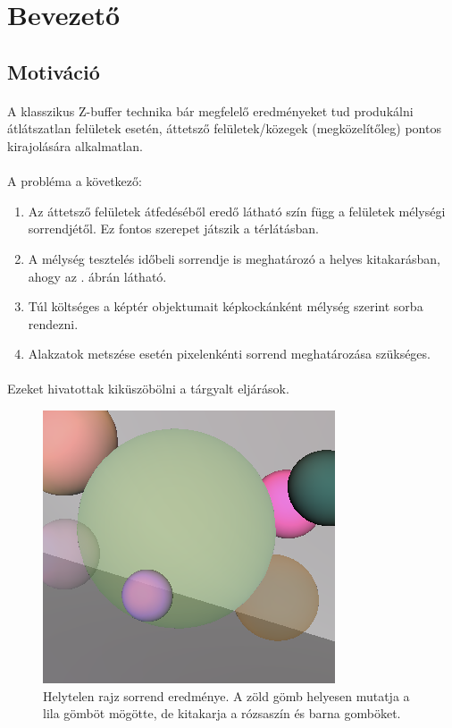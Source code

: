 \section{Bevezető}
\subsection{Motiváció}
\paragraph{}A klasszikus Z-buffer technika bár megfelelő eredményeket tud produkálni átlátszatlan felületek esetén, áttetsző felületek/közegek (megközelítőleg) pontos kirajolására alkalmatlan.
\paragraph{}A probléma a következő:
\begin{enumerate}
	\item Az áttetsző felületek átfedéséből eredő látható szín függ a felületek mélységi sorrendjétől. Ez fontos szerepet játszik a térlátásban.
	\item A mélység tesztelés időbeli sorrendje is meghatározó a helyes kitakarásban, ahogy az . ábrán látható.
	\item Túl költséges a képtér objektumait képkockánként mélység szerint sorba rendezni.
	\item Alakzatok metszése esetén pixelenkénti sorrend meghatározása szükséges.
\end{enumerate}

\paragraph{}
Ezeket hivatottak kiküszöbölni a tárgyalt eljárások.
\vfill
\begin{figure}[bp]
	\centering
	\includegraphics[scale=0.4]{invisglass.png}
	\caption{Helytelen rajz sorrend eredménye. A zöld gömb helyesen mutatja a lila gömböt mögötte, de kitakarja a rózsaszín és barna gomböket.}
	\label{img:invisglass}
\end{figure}

\newpage
